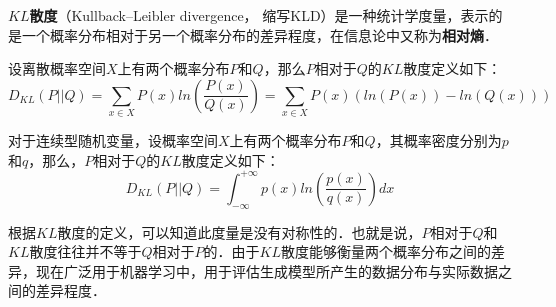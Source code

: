 

\textbf{$KL$散度}（Kullback–Leibler divergence， 缩写KLD）是一种统计学度量，表示的是一个概率分布相对于另一个概率分布的差异程度，在信息论中又称为\textbf{相对熵}．

设离散概率空间$X$上有两个概率分布$P$和$Q$，那么$P$相对于$Q$的$KL$散度定义如下：
\begin{equation}
D_{KL}(P||Q)=\sum_{x\in X}P(x)ln(\frac{P(x)}{Q(x)})=\sum_{x\in X}P(x)(ln(P(x))-ln(Q(x)))
\end{equation}

对于连续型随机变量，设概率空间$X$上有两个概率分布$P$和$Q$，其概率密度分别为$p$和$q$，那么，$P$相对于$Q$的$KL$散度定义如下：
\begin{equation}
D_{KL}(P||Q)=\int_{-\infty}^{+\infty}p(x)ln(\frac{p(x)}{q(x)})dx
\end{equation}

根据$KL$散度的定义，可以知道此度量是没有对称性的．也就是说，$P$相对于$Q$和$KL$散度往往并不等于$Q$相对于$P$的．由于$KL$散度能够衡量两个概率分布之间的差异，现在广泛用于机器学习中，用于评估生成模型所产生的数据分布与实际数据之间的差异程度．